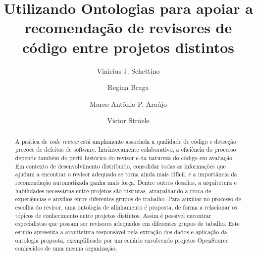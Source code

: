 \documentclass[sigconf]{acmart}
\begin{document}
\title{Utilizando Ontologias para apoiar a recomendação de revisores de código entre projetos distintos}

\author{Vinicius J. Schettino}

\author{Regina Braga}

\author{Marco Antônio P. Araújo}

\author{Victor Ströele}

\renewcommand{\shortauthors}{Schettino et al.}


\begin{abstract}
A prática de \textit{code review} está amplamente associada a qualidade de código e detecção precoce de defeitos de software. Intrinsecamente colaborativo, a eficiência do processo depende também do perfil histórico do revisor e da natureza do código em avaliação. Em contexto de desenvolvimento distribuído, consolidar todas as informações que ajudam a encontrar o revisor adequado se torna ainda mais difícil, e a importância da recomendação automatizada ganha mais força. Dentre outros desafios, a arquitetura e habilidades necessárias entre projetos são distintas, atrapalhando a troca de experiências e auxílios entre diferentes grupos de trabalho. Para auxiliar no processo de escolha do revisor, uma ontologia de alinhamento é proposta, de forma a relacionar os tópicos de conhecimento entre projetos distintos. Assim é possível encontrar especialistas que possam ser revisores adequados em diferentes grupos de tabalho. Este estudo apresenta a  arquitetura responsável pela extração dos dados e aplicação da ontologia proposta, exemplificado por um cenário envolvendo projetos OpenSource conhecidos de uma mesma organização.
\end{abstract}

%
%
\end{document}
